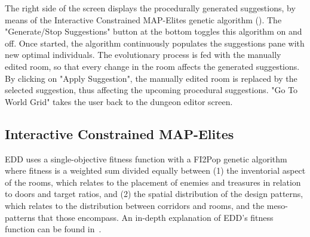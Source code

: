 The right side of the screen displays the procedurally generated suggestions, by means of the Interactive Constrained MAP-Elites genetic algorithm (). The "Generate/Stop Suggestions" button at the bottom toggles this algorithm on and off. Once started, the algorithm continuously populates the suggestions pane with new optimal individuals. The evolutionary process is fed with the manually edited room, so that every change in the room affects the generated suggestions. By clicking on "Apply Suggestion", the manually edited room is replaced by the selected suggestion, thus affecting the upcoming procedural suggestions. "Go To World Grid" takes the user back to the dungeon editor screen.

\subsection{Interactive Constrained MAP-Elites\label{section:illuminating}}



EDD uses a single-objective fitness function with a FI2Pop genetic algorithm where fitness is a weighted sum divided equally between (1) the inventorial aspect of the rooms, which relates to the placement of enemies and treasures in relation to doors and target ratios, and (2) the spatial distribution of the design patterns, which relates to the distribution between corridors and rooms, and the meso-patterns that those encompass. An in-depth explanation of EDD's fitness function can be found in~.

